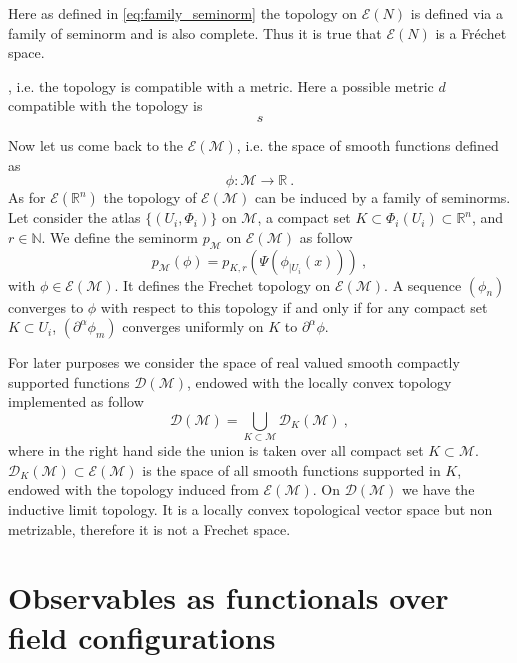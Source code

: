\documentclass[11pt]{book}
\newcommand{\Dcal}{\mathcal{D}}
\newcommand{\Ecal}{\mathcal{E}}
\newcommand{\Mcal}{\mathcal{M}}
\newcommand{\Nbb}{\mathbb{N}}
\newcommand{\Rbb}{\mathbb{R}}
\theoremstyle{break}
\begin{document}
Here as defined in \ref{eq:family_seminorm} the topology on $\Ecal(N)$ is defined via a family of seminorm and is also complete. Thus it is true that $\Ecal(N)$ is a Fréchet space.


, i.e. the topology is compatible with a metric. Here a possible metric $d$ compatible with the topology is 
%
\begin{equation*}
s 
\end{equation*}



Now let us come back to the $\Ecal(\Mcal)$, i.e. the space of smooth functions defined as 
%
\begin{equation*}
\phi : \Mcal \to \Rbb \ . 
\end{equation*}
%
As for $\Ecal(\Rbb^n)$ the topology of $\Ecal(\Mcal)$ can be induced by a family of seminorms. Let consider the atlas $\{(U_i,\Phi_i)\}$ on $\Mcal$, a compact set $K \subset \Phi_i(U_i) \subset \Rbb^n$, and $r \in \Nbb$. We define the seminorm $p_\Mcal$ on $\Ecal(\Mcal)$ as follow
%
\begin{equation*}
p_\Mcal(\phi) = p_{K,r}\left( \Psi\left( \phi_{|U_i}(x) \right) \right) \ ,
\end{equation*}
%
with $\phi \in \Ecal\left(\Mcal \right)$. It defines the Frechet topology on $\Ecal\left(\Mcal \right)$. A sequence $(\phi_n)$ converges to $\phi$ with respect to this topology if and only if for any compact set $K \subset U_i$, $\left(\partial^\alpha\phi_m\right)$ converges uniformly on $K$ to $\partial^\alpha\phi$.


For later purposes we consider the space of real valued smooth compactly supported functions $\Dcal(\Mcal)$, endowed with the locally convex topology implemented as follow
%
\begin{equation*}
\Dcal(\Mcal) = \bigcup_{K\subset\Mcal} \Dcal_K(\Mcal) \ ,
\end{equation*}
%
where in the right hand side the union is taken over all compact set $K \subset \Mcal$. $\Dcal_K(\Mcal) \subset \Ecal(\Mcal)$ is the space of all smooth functions supported in $K$, endowed with the topology induced from $\Ecal(\Mcal)$. On $\Dcal(\Mcal)$ we have the inductive limit topology. It is a locally convex topological vector space but non metrizable, therefore it is not a Frechet space. 


\section{Observables as functionals over field configurations}\label{p:OBS}
\end{document}
